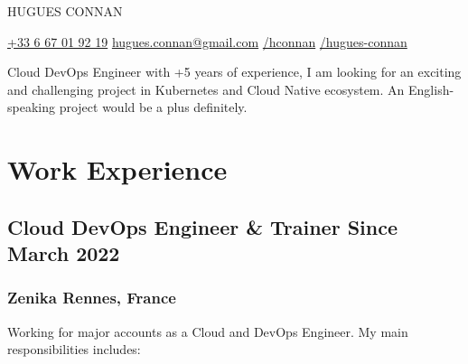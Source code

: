\documentclass[11pt]{article}
\newcommand{\rside}[1]{
  \hfill {\normalfont\color{gray} #1}%
}
\begin{document}

\begin{center}
  {
    \fontsize{36}{12} 
    \selectfont
    \color{accent} 
    HUGUES CONNAN %
  } \\ \medskip


  \href{tel:+33667019219}{{\color{accent}{\faPhone}} +33 6 67 01 92 19} \quad
  \href{mailto:hugues.connan@gmail.com}{{\color{accent}{\faEnvelope}} hugues.connan@gmail.com} \quad 
  \href{https://github.com/hconnan}{{\color{accent}{\faGithub}} /hconnan} \quad
  \href{https://www.linkedin.com/in/hugues-connan}{{\color{accent}{\faLinkedin}} /hugues-connan} \quad
\end{center}


\begin{justify}
  Cloud DevOps Engineer with +5 years of experience, I am looking for an exciting and challenging project in Kubernetes and Cloud Native ecosystem. An English-speaking project would be a plus definitely.
\end{justify}
\section{Work Experience}

\subsection{Cloud DevOps Engineer \& Trainer \rside{Since March 2022}}
\subsubsection{Zenika \rside{Rennes, France}}

\begin{justify}
  Working for major accounts as a Cloud and DevOps Engineer. My main responsibilities includes:
\end{justify}
\vspace{-2mm}
\end{document}
